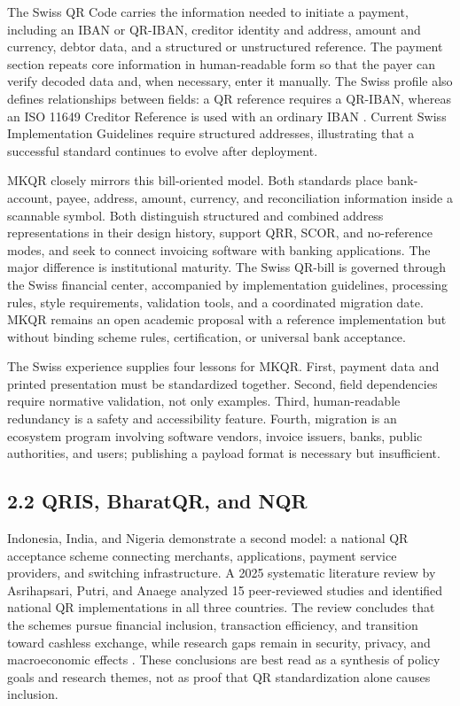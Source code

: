 The Swiss QR Code carries the information needed to initiate a payment, including an IBAN or QR-IBAN, creditor identity and address, amount and currency, debtor data, and a structured or unstructured reference. The payment section repeats core information in human-readable form so that the payer can verify decoded data and, when necessary, enter it manually. The Swiss profile also defines relationships between fields: a QR reference requires a QR-IBAN, whereas an ISO 11649 Creditor Reference is used with an ordinary IBAN \cite{sixguidelines,sixfaq}. Current Swiss Implementation Guidelines require structured addresses, illustrating that a successful standard continues to evolve after deployment.

MKQR closely mirrors this bill-oriented model. Both standards place bank-account, payee, address, amount, currency, and reconciliation information inside a scannable symbol. Both distinguish structured and combined address representations in their design history, support QRR, SCOR, and no-reference modes, and seek to connect invoicing software with banking applications. The major difference is institutional maturity. The Swiss QR-bill is governed through the Swiss financial center, accompanied by implementation guidelines, processing rules, style requirements, validation tools, and a coordinated migration date. MKQR remains an open academic proposal with a reference implementation but without binding scheme rules, certification, or universal bank acceptance.

The Swiss experience supplies four lessons for MKQR. First, payment data and printed presentation must be standardized together. Second, field dependencies require normative validation, not only examples. Third, human-readable redundancy is a safety and accessibility feature. Fourth, migration is an ecosystem program involving software vendors, invoice issuers, banks, public authorities, and users; publishing a payload format is necessary but insufficient.

\subsection{2.2 QRIS, BharatQR, and NQR}

Indonesia, India, and Nigeria demonstrate a second model: a national QR acceptance scheme connecting merchants, applications, payment service providers, and switching infrastructure. A 2025 systematic literature review by Asrihapsari, Putri, and Anaege analyzed 15 peer-reviewed studies and identified national QR implementations in all three countries. The review concludes that the schemes pursue financial inclusion, transaction efficiency, and transition toward cashless exchange, while research gaps remain in security, privacy, and macroeconomic effects \cite{asrihapsari2025}. These conclusions are best read as a synthesis of policy goals and research themes, not as proof that QR standardization alone causes inclusion.

